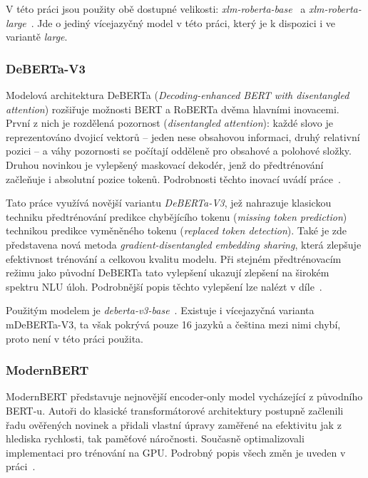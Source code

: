 V této práci jsou použity obě dostupné velikosti: \emph{xlm-roberta-base}~\cite{XLMRoBERTabase} a \emph{xlm-roberta-large}~\cite{XLMRoBERTalarge}. Jde o jediný vícejazyčný model v této práci, který je k dispozici i ve variantě \emph{large}.

\subsubsection{DeBERTa-V3}
Modelová architektura DeBERTa (\emph{Decoding-enhanced BERT with disentangled attention}) rozšiřuje možnosti BERT a RoBERTa dvěma hlavními inovacemi. První z nich je rozdělená pozornost (\emph{disentangled attention}): každé slovo je reprezentováno dvojicí vektorů -- jeden nese obsahovou informaci, druhý relativní pozici -- a váhy pozornosti se počítají odděleně pro obsahové a polohové složky. Druhou novinkou je vylepšený maskovací dekodér, jenž do předtrénování začleňuje i absolutní pozice tokenů. Podrobnosti těchto inovací uvádí práce~\cite{he2021debertadecodingenhancedbertdisentangled}.

Tato práce využívá novější variantu \emph{DeBERTa-V3}, jež nahrazuje klasickou techniku předtrénování predikce chybějícího tokenu (\emph{missing token prediction}) technikou predikce vyměněného tokenu (\emph{replaced token detection}). Také je zde představena nová metoda \emph{gradient-disentangled embedding sharing}, která zlepšuje efektivnost trénování a celkovou kvalitu modelu. Při stejném předtrénovacím režimu jako původní DeBERTa tato vylepšení ukazují zlepšení na širokém spektru NLU úloh. Podrobnější popis těchto vylepšení lze nalézt v díle~\cite{he2023debertav3improvingdebertausing}.

Použitým modelem je \emph{deberta-v3-base}~\cite{DeBERTav3base}. Existuje i vícejazyčná varianta mDeBERTa-V3, ta však pokrývá pouze 16 jazyků a čeština mezi nimi chybí, proto není v této práci použita.

\subsubsection{ModernBERT}
ModernBERT představuje nejnovější encoder-only model vycházející z původního BERT-u. Autoři do klasické transformátorové architektury postupně začlenili řadu ověřených novinek a přidali vlastní úpravy zaměřené na efektivitu jak z hlediska rychlosti, tak paměťové náročnosti. Současně optimalizovali implementaci pro trénování na GPU. Podrobný popis všech změn je uveden v práci~\cite{warner2024smarterbetterfasterlonger}.

